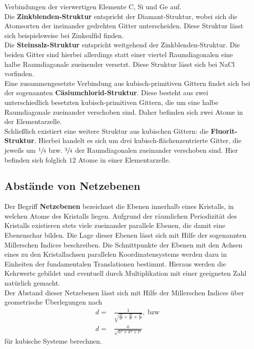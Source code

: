 Verbindungen der vierwertigen Elemente C, Si und Ge auf.\\
Die \textbf{Zinkblenden-Struktur} entspricht der Diamant-Struktur, wobei sich die Atomsorten der ineinander gedrehten
Gitter unterscheiden. Diese Struktur lässt sich beispielsweise bei Zinksulfid finden. \\
Die \textbf{Steinsalz-Struktur} entspricht weitgehend der Zinkblenden-Struktur. Die beiden Gitter sind hierbei allerdings
statt einer viertel Raumdiagonalen eine halbe Raumdiagonale zueinender versetzt. Diese Struktur lässt sich bei NaCl
vorfinden.\\
Eine zusammengesetzte Verbindung aus kubisch-primitiven Gittern findet sich bei der sogenannten \textbf{Cäsiumchlorid-Struktur}.
Diese besteht aus zwei unterschiedlich besetzten kubisch-primitiven Gittern, die um eine halbe Raumdiagonale zueinander verschoben
sind. Daher befinden sich zwei Atome in der Elementarzelle. \\
Schließlich existiert eine weitere Struktur aus kubischen Gittern: die \textbf{Fluorit-Struktur}. Hierbei handelt es sich um drei
kubisch-flächenzentrierte Gitter, die jeweils um $\sfrac{1}{4}$ bzw. $\sfrac{3}{4}$ der Raumdiagonalen zueinander verschoben sind.
Hier befinden sich folglich $12$ Atome in einer Elementarzelle.
%
\subsection{Abstände von Netzebenen}
%
Der Begriff \textbf{Netzebenen} bezeichnet die Ebenen innerhalb eines Kristalls, in welchen Atome des Kristalls liegen. Aufgrund
der räumlichen Periodizität des Kristalls existieren stets viele zueinander parallele Ebenen, die damit eine Ebenenschar bilden.
Die Lage dieser Ebenen lässt sich mit Hilfe der sogenannten Millerschen Indices beschreiben. Die Schnittpunkte der Ebenen mit den
Achsen eines zu den Kristallachsen parallelen Koordinatensystems werden dazu in Einheiten der fundamentalen Translationen bestimmt.
Hieraus werden die Kehrwerte gebildet und eventuell durch Multiplikation mit einer geeigneten Zahl natürlich gemacht.\\
Der Abstand dieser Netzebenen lässt sich mit Hilfe der Millerschen Indices über geometrische Überlegungen nach
%
\begin{align}
  d=&\frac{1}{\sqrt{\frac{h²}{a²}+\frac{k²}{b²}+\frac{l²}{c²}}}, \; \text{bzw} \\
  d=&\frac{a}{\sqrt{h²+k²+l²}}
  \label{eq:d}
\end{align}
%
für kubische Systeme berechnen.
%
